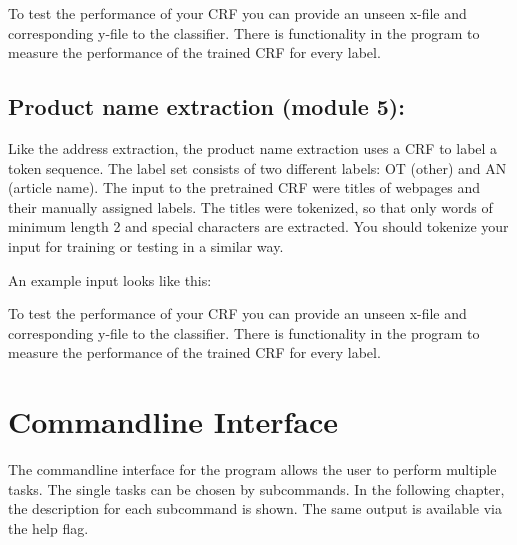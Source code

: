 \documentclass[letterpaper,10pt,english]{sphinxmanual}
\begin{document}
To test the performance of your CRF you can provide an unseen x-file
and corresponding y-file to the classifier. There is functionality in
the program to measure the performance of the trained CRF for every
label.


\section{Product name extraction (module 5):}
\label{\detokenize{training:product-name-extraction-module-5}}
Like the address extraction, the product name extraction uses a CRF to
label a token sequence. The label set consists of two different
labels: OT (other) and AN (article name). The input to the pretrained
CRF were titles of webpages and their manually assigned labels. The
titles were tokenized, so that only words of minimum length 2 and
special characters are extracted. You should tokenize your input for
training or testing in a similar way.

An example input looks like this:

%
\begin{sphinxVerbatim}[commandchars=\\\{\}]
           
        
           
        
\end{sphinxVerbatim}

To test the performance of your CRF you can provide an unseen x-file
and corresponding y-file to the classifier. There is functionality in
the program to measure the performance of the trained CRF for every
label.


\chapter{Commandline Interface}
\label{\detokenize{commandline:commandline}}\label{\detokenize{commandline::doc}}\label{\detokenize{commandline:commandline-interface}}
The commandline interface for the program allows the user to perform
multiple tasks. The single tasks can be chosen by subcommands. In the
following chapter, the description for each subcommand is shown. The
same output is available via the \textendash{}help flag.
\end{document}
